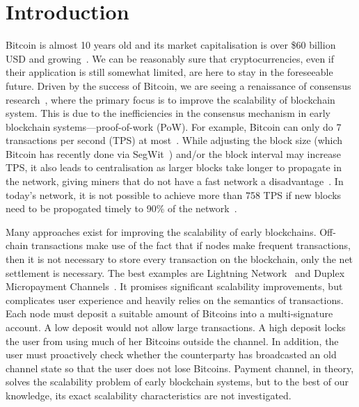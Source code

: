 \section{Introduction}

Bitcoin is almost 10 years old and its market capitalisation is over \$60 billion USD and growing~\cite{bitcoinmarketcap}.
We can be reasonably sure that cryptocurrencies,
even if their application is still somewhat limited,
are here to stay in the foreseeable future.
Driven by the success of Bitcoin, we are seeing a renaissance of consensus research~\cite{miller2016honey, kogias2016enhancing, kokoris2017omniledger},
where the primary focus is to improve the scalability of blockchain system.
This is due to the inefficiencies in the consensus mechanism in early blockchain systems---proof-of-work (PoW).
For example, Bitcoin can only do 7 transactions per second (TPS) at most~\cite{vukolic2015quest}.
While adjusting the block size (which Bitcoin has recently done via SegWit~\cite{segwit}) and/or the block interval may increase TPS,
it also leads to centralisation as larger blocks take longer to propagate in the network,
giving miners that do not have a fast network a disadvantage~\cite{croman2016scaling}.
In today's network, it is not possible to achieve more than 758 TPS
if new blocks need to be propogated timely to 90\% of the network~\cite{croman2016scaling}.

Many approaches exist for improving the scalability of early blockchains.
Off-chain transactions make use of the fact that if nodes make frequent transactions,
then it is not necessary to store every transaction on the blockchain,
only the net settlement is necessary.
The best examples are Lightning Network~\cite{lightningnetwork} and Duplex Micropayment Channels~\cite{decker2015fast}.
It promises significant scalability improvements,
but complicates user experience and heavily relies on the semantics of transactions.
Each node must deposit a suitable amount of Bitcoins into a multi-signature account.
A low deposit would not allow large transactions.
A high deposit locks the user from using much of her Bitcoins outside the channel.
In addition, the user must proactively check whether the counterparty has broadcasted an old channel state so that the user does not lose Bitcoins.
Payment channel, in theory, solves the scalability problem of early blockchain systems,
but to the best of our knowledge, its exact scalability characteristics are not investigated.

